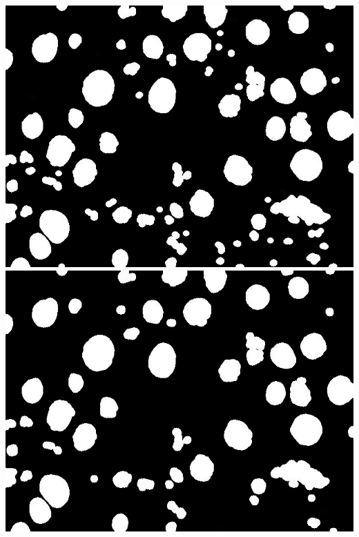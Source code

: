 \documentclass[a4paper]{article}
\begin{document}
\begin{minipage}{0.24\textwidth}
    \centering
    \includegraphics[width=\textwidth]{../code/task1/output/kernel_size_13.jpg}
    \includegraphics[width=\textwidth]{../code/task1/output/kernel_size_15.jpg}
\end{minipage}
\end{document}
